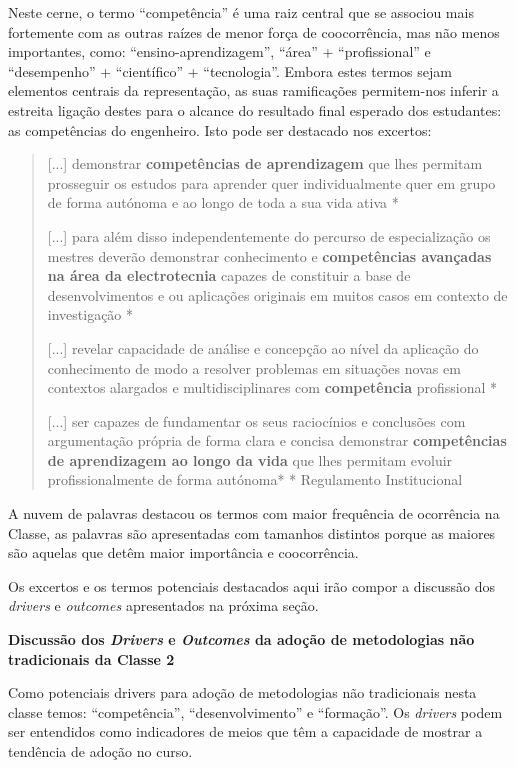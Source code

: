 \documentclass{textolivre}
\begin{document}
Neste cerne, o termo “competência” é uma raiz central que se associou mais fortemente com as outras raízes de menor força de coocorrência, mas não menos importantes, como: “ensino-aprendizagem”, “área” + “profissional” e “desempenho” + “científico” + “tecnologia”. Embora estes termos sejam elementos centrais da representação, as suas ramificações permitem-nos inferir a estreita ligação destes para o alcance do resultado final esperado dos estudantes: as competências do engenheiro. Isto pode ser destacado nos excertos:

\begin{quote}[...] demonstrar \textbf{competências de aprendizagem} que lhes permitam prosseguir os estudos para aprender quer individualmente quer em grupo de forma autónoma e ao longo de toda a sua vida ativa  *

[...] para além disso independentemente do percurso de especialização os mestres deverão demonstrar conhecimento e \textbf{competências avançadas na área da electrotecnia} capazes de constituir a base de desenvolvimentos e ou aplicações originais em muitos casos em contexto de investigação  *

[...] revelar capacidade de análise e concepção ao nível da aplicação do conhecimento de modo a resolver problemas em situações novas em contextos alargados e multidisciplinares com \textbf{competência} profissional *

[...] ser capazes de fundamentar os seus raciocínios e conclusões com argumentação própria de forma clara e concisa demonstrar \textbf{competências de aprendizagem ao longo da vida} que lhes permitam evoluir profissionalmente de forma autónoma*
* Regulamento Institucional \cite[grifo nosso]{utad2018}
\end{quote}

A nuvem de palavras destacou os termos com maior frequência de ocorrência na Classe, as palavras são apresentadas com tamanhos distintos porque as maiores são aquelas que detêm maior importância e coocorrência.

Os excertos e os termos potenciais destacados aqui irão compor a discussão dos \textit{drivers} e \textit{outcomes} apresentados na próxima seção.

\textbf{Discussão dos \textit{Drivers} e \textit{Outcomes} da adoção de metodologias não tradicionais da Classe 2}

Como potenciais drivers para adoção de metodologias não tradicionais nesta classe temos: “competência”, “desenvolvimento” e “formação”. Os \textit{drivers} podem ser entendidos como indicadores de meios que têm a capacidade de mostrar a tendência de adoção no curso.
\end{document}
